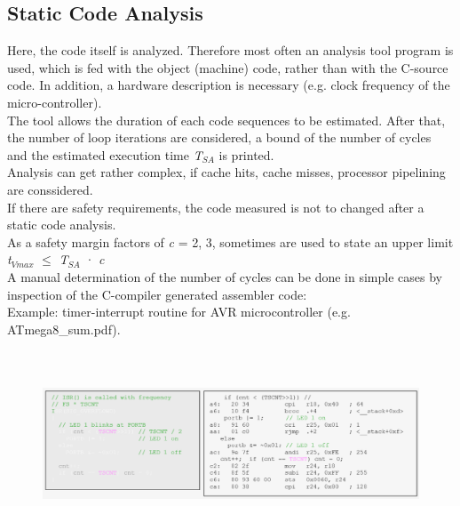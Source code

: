 \subsection{Static Code Analysis}

Here, the code itself is analyzed. Therefore most often an analysis tool program is used, which is fed with the object (machine) code, rather than with the C-source code. In addition, a hardware description is necessary (e.g. clock frequency of the micro-controller). \\

The tool allows the duration of each code sequences to be estimated. After that, the number of loop iterations are considered, a bound of the number of cycles and the estimated execution time \textit{T${}_{SA}$} is printed.\\

Analysis can get rather complex, if cache hits, cache misses, processor pipelining are conssidered. \\

If there are safety requirements, the code measured is not to changed after a static code analysis.\\

As a safety margin factors of \textit{c} = 2, 3, sometimes are used to state an upper limit\\

\textit{t}${}_{Vmax}$ $\mathrm{\le}$ \textit{T${}_{SA}$ }· \textit{c}\\

A manual determination of the number of cycles can be done in simple cases by inspection of the C-compiler generated assembler code:\\

Example: timer-interrupt routine for AVR microcontroller (e.g. ATmega8\_sum.pdf).

	\begin{figure}[h]
    \centering
    \includegraphics[width=17cm, height=5.5cm]{Images/image78.png}
    \label{fig:Fig }
    \end{figure}
    
